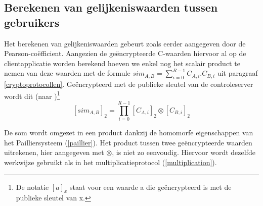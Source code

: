 \subsection{Berekenen van gelijkeniswaarden tussen gebruikers}
\label{similarities}

Het berekenen van gelijkeniswaarden gebeurt zoals eerder aangegeven door de Pearson-co\"efficient. Aangezien de ge\"encrypteerde C-waarden hiervoor al op de clientapplicatie worden berekend hoeven we enkel nog het scalair product te nemen van deze waarden met de formule $sim_{A,B} = \sum_{i=0}^{R-1} C_{A,i}.C_{B,i}$ uit paragraaf \ref{cryptoprotocollen}. Ge\"encrypteerd met de publieke sleutel van de controleserver wordt dit (naar \cite{ZErkinDyn})\footnote{De notatie $[a]_x$ staat voor een waarde a die ge\"encrypteerd is met de publieke sleutel van x.}
\begin{equation}\label{similarity}[sim_{A,B}]_2 = \prod_{i=0}^{R-1} [C_{A,i}]_2 \otimes [C_{B,i}]_2 \end{equation}

De som wordt omgezet in een product dankzij de homomorfe eigenschappen van het Pailliersysteem (\ref{paillier}). Het product tussen twee ge\"encrypteerde waarden uitrekenen, hier aangegeven met  $\otimes$, is niet zo eenvoudig. Hiervoor wordt dezelfde werkwijze gebruikt als in het multiplicatieprotocol (\ref{multiplication}).